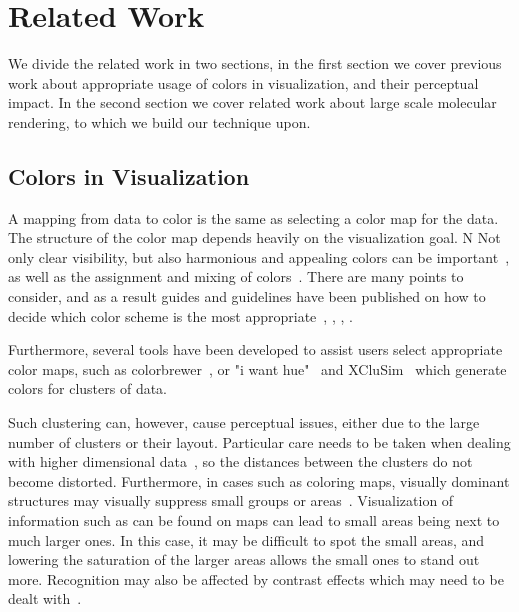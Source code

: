 \documentclass[review,journal]{vgtc}         %
\begin{document}
\section{Related Work}

We divide the related work in two sections, in the first section we cover previous work about appropriate usage of colors in visualization, and their perceptual impact. 
In the second section we cover related work about large scale molecular rendering, to which we build our technique upon.

\subsection{Colors in Visualization}

A mapping from data to color is the same as selecting a color map for the data. 
The structure of the color map depends heavily on the visualization goal. 
N
Not only clear visibility, but also harmonious and appealing colors can be important~\cite{ihaka2003colour}, as well as the assignment and mixing of colors~\cite{wang2008color}. 
There are many points to consider, and as a result guides and guidelines have been published on how to decide which color scheme is the most appropriate~\cite{bergman1995rule}, \cite{healey1996choosing}, \cite{bernard2015survey}, \cite{steiger2015explorative}.

Furthermore, several tools have been developed to assist users select appropriate color maps, such as colorbrewer~\cite{harrower2003colorbrewer}, or "i want hue"~\cite{iwanthue} and XCluSim~\cite{l2015xclusim} which generate colors for clusters of data. 

Such clustering can, however, cause perceptual issues, either due to the large number of clusters or their layout. 
Particular care needs to be taken when dealing with higher dimensional data~\cite{mittelstiidt2014revisiting}, so the distances between the clusters do not become distorted. 
Furthermore, in cases such as coloring maps, visually dominant structures may visually suppress small groups or areas~\cite{lee2013perceptually}.
Visualization of information such as can be found on maps can lead to small areas being next to much larger ones. 
In this case, it may be difficult to spot the small areas, and lowering the saturation of the larger areas allows the small ones to stand out more.
Recognition may also be affected by contrast effects which may need to be dealt with~\cite{mittelstadt2014methods}. 
\end{document}
